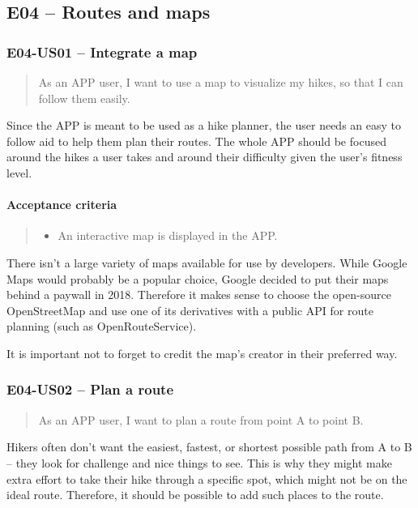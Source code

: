 \subsection*{E04 -- Routes and maps}

\subsubsection*{E04-US01 -- Integrate a map}
\begin{quote}
As an APP user, I want to use a map to visualize my hikes, so that I can follow them easily.
\end{quote}

Since the APP is meant to be used as a hike planner, the user needs an easy to follow aid to help them plan their routes.
The whole APP should be focused around the hikes a user takes and around their difficulty given the user's fitness level.

\paragraph*{Acceptance criteria}
\begin{quote}
\begin{itemize}
    \item An interactive map is displayed in the APP.
\end{itemize}
\end{quote}

There isn't a large variety of maps available for use by developers.
While Google Maps would probably be a popular choice, Google decided to put their maps behind a paywall\cite{google-maps-paywall} in 2018.
Therefore it makes sense to choose the open-source OpenStreetMap\cite{OpenStreetMap} and use one of its derivatives with a public API for route planning (such as OpenRouteService\cite{OpenRouteService}).

It is important not to forget to credit the map's creator in their preferred way.

\subsubsection*{E04-US02 -- Plan a route}
\begin{quote}
As an APP user, I want to plan a route from point A to point B.
\end{quote}

Hikers often don't want the easiest, fastest, or shortest possible path from A to B -- they look for challenge and nice things to see.
This is why they might make extra effort to take their hike through a specific spot, which might not be on the ideal route.
Therefore, it should be possible to add such places to the route.

